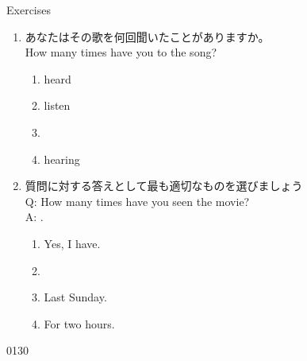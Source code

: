 \documentclass[aspectratio=169,xcolor={dvipsnames,table}]{beamer}
\newcommand{\myaudio}[1]{\href{#1}{\faVolumeUp}}
\begin{document}
\begin{frame}[plain]{Exercises}
 
\begin{enumerate}
    \item あなたはその歌を何回聞いたことがありますか。\\
    How many times have you \underline{\hspace{2cm}} to the song?
    \begin{enumerate}
        \item heard
        \item listen
        \item {}
        \item hearing
    \end{enumerate}
    
    \item 質問に対する答えとして最も適切なものを選びましょう\\
    Q: How many times have you seen the movie?\\
    A: \underline{\hspace{2cm}}.
    \begin{enumerate}
        \item Yes, I have.
        \item {}
        \item Last Sunday.
        \item For two hours.
    \end{enumerate}
\end{enumerate}
\hfill{\tiny 0130}\,{\scriptsize \myaudio{./audio/013_have_pp_keiken_062.mp3}}

\end{frame}
\end{document}
